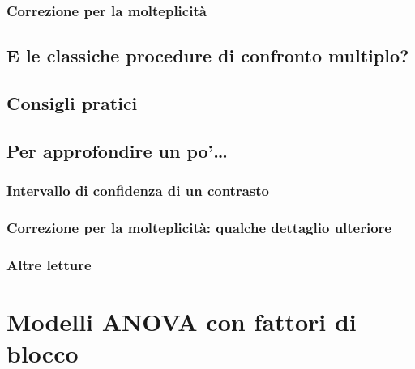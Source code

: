 \documentclass[a4paper,12pt,oneside]{book}
\begin{document}
\hypertarget{correzione-per-la-molteplicituxe0}{%
\subsection{Correzione per la molteplicità}\label{correzione-per-la-molteplicituxe0}}

\hypertarget{e-le-classiche-procedure-di-confronto-multiplo}{%
\section{E le classiche procedure di confronto multiplo?}\label{e-le-classiche-procedure-di-confronto-multiplo}}

\hypertarget{consigli-pratici}{%
\section{Consigli pratici}\label{consigli-pratici}}

\hypertarget{per-approfondire-un-po-3}{%
\section{Per approfondire un po'\ldots{}}\label{per-approfondire-un-po-3}}

\hypertarget{intervallo-di-confidenza-di-un-contrasto}{%
\subsection{Intervallo di confidenza di un contrasto}\label{intervallo-di-confidenza-di-un-contrasto}}

\hypertarget{correzione-per-la-molteplicituxe0-qualche-dettaglio-ulteriore}{%
\subsection{Correzione per la molteplicità: qualche dettaglio ulteriore}\label{correzione-per-la-molteplicituxe0-qualche-dettaglio-ulteriore}}

\hypertarget{altre-letture-7}{%
\subsection{Altre letture}\label{altre-letture-7}}

\hypertarget{modelli-anova-con-fattori-di-blocco}{%
\chapter{Modelli ANOVA con fattori di blocco}\label{modelli-anova-con-fattori-di-blocco}}
\end{document}
